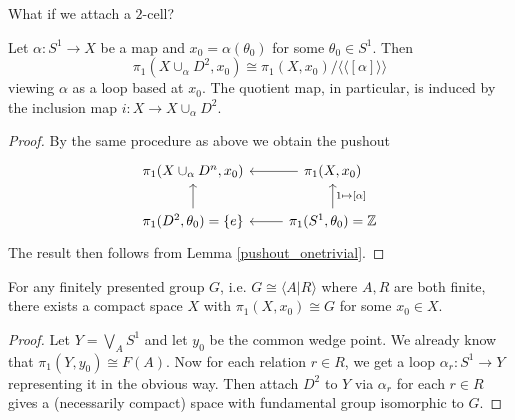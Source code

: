 What if we attach a $2$-cell?
\begin{lemma}
    Let $\alpha:S^1\to X$  be a map and $x_0=\alpha(\theta_0)$ for some $\theta_0\in S^1$.
    Then
    $$\pi_1(X\cup_\alpha D^2,x_0)\cong\pi_1(X,x_0)/\langle\langle [\alpha]\rangle\rangle$$
    viewing $\alpha$ as a loop based at $x_0$.
    The quotient map, in particular, is induced by the inclusion map $i:X\to X\cup_\alpha D^2$.
\end{lemma}
\begin{proof}
    By the same procedure as above we obtain the pushout
    \[
        \begin{tikzcd}
            \pi_1(X\cup_\alpha D^n,x_0)&\pi_1(X,x_0)\arrow{l}\\
            \pi_1(D^2,\theta_0)=\{e\}\arrow{u}&\pi_1(S^1,\theta_0)=\mathbb Z\arrow{l}\arrow[swap]{u}{1\mapsto [\alpha]}
        \end{tikzcd}
    \]
    The result then follows from Lemma \ref{pushout_onetrivial}.
\end{proof}
\begin{theorem}
    For any finitely presented group $G$, i.e. $G\cong\langle A|R\rangle$ where $A,R$ are both finite, there exists a compact space $X$ with $\pi_1(X,x_0)\cong G$ for some $x_0\in X$.
\end{theorem}
\begin{proof}
    Let $Y=\bigvee_AS^1$ and let $y_0$ be the common wedge point.
    We already know that $\pi_1(Y,y_0)\cong F(A)$.
    Now for each relation $r\in R$, we get a loop $\alpha_r:S^1\to Y$ representing it in the obvious way.
    Then attach $D^2$ to $Y$ via $\alpha_r$ for each $r\in R$ gives a (necessarily compact) space with fundamental group isomorphic to $G$.
\end{proof}
